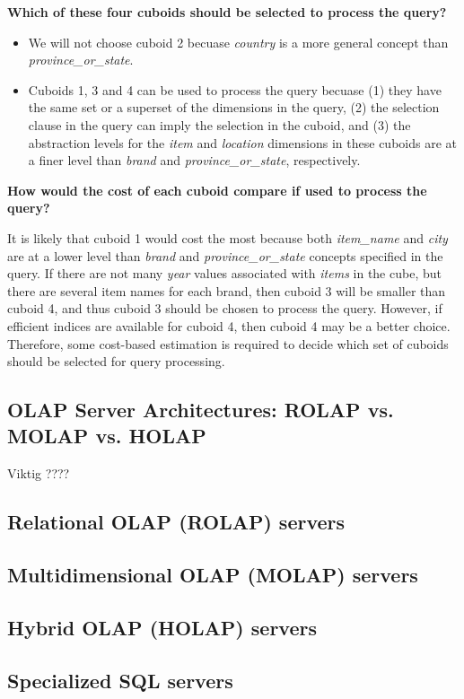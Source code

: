 		{\bf Which of these four cuboids should be selected to process the query?}

		\begin{itemize}
			\item We will not choose cuboid 2 becuase {\it country} is a more general
			concept than {\it province\_or\_state}.
			\item Cuboids 1, 3 and 4 can be used to process the query becuase (1) they have 
			the same set or a superset of the dimensions in the query, (2) the selection clause
			in the query can imply the selection in the cuboid, and (3) the abstraction levels
			for the {\it item} and {\it location} dimensions in these cuboids are at a finer 
			level than {\it brand} and {\it province\_or\_state}, respectively.
		\end{itemize}

		{\bf How would the cost of each cuboid compare if used to process the query?}

		It is likely that cuboid 1 would cost the most because both {\it item\_name}
		and {\it city} are at a lower level than {\it brand} and {\it province\_or\_state}
		concepts specified in the query. If there are not many {\it year} values associated with {\it items} 
		in the cube, but there are several item names for each brand, then cuboid 3 will be smaller 
		than cuboid 4, and thus cuboid 3 should be chosen to process the query. 
		However, if efficient indices are available for cuboid 4, then cuboid 4 may be a better choice. 
		Therefore, some cost-based estimation is required to decide which set of cuboids should 
		be selected for query processing.

	\clearpage
	\subsection{OLAP Server Architectures: ROLAP vs. MOLAP vs. HOLAP}

		{\color{red} \Large Viktig ????}

		\subsection*{Relational OLAP (ROLAP) servers}

		\subsection*{Multidimensional OLAP (MOLAP) servers}

		\subsection*{Hybrid OLAP (HOLAP) servers}

		\subsection*{Specialized SQL servers}





